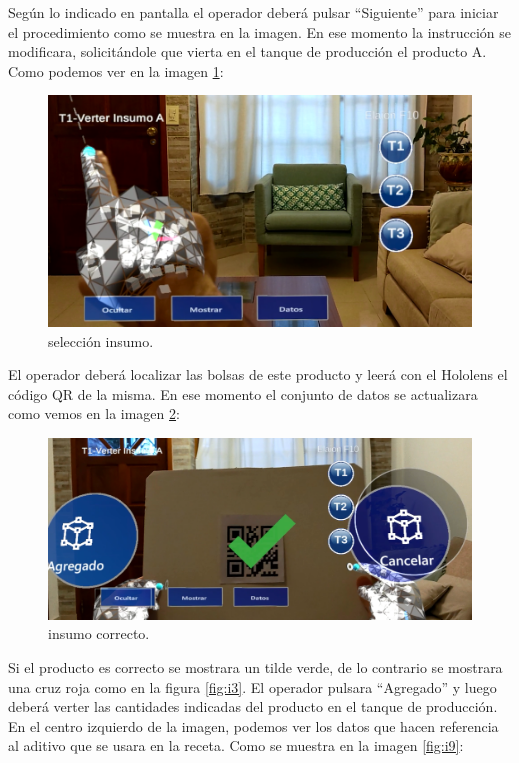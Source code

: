 Según lo indicado en pantalla el operador deberá pulsar ``Siguiente'' para iniciar el procedimiento como se muestra en la imagen. En ese momento la instrucción se modificara, solicitándole que vierta en el tanque de producción el producto A. Como podemos ver en la imagen \ref{fig:i7}:

\begin{figure}[htpb]
	\centering
	\includegraphics[scale=.5]{./Figures/i7.PNG}
	\caption{selección insumo\protect\footnotemark.}
	\label{fig:i7}
\end{figure}

El operador deberá localizar las bolsas de este producto y leerá con el Hololens el código QR de la misma. En ese momento el conjunto de datos se actualizara como vemos en la imagen \ref{fig:i8}:

\begin{figure}[htpb]
	\centering
	\includegraphics[scale=.5]{./Figures/i8.PNG}
	\caption{insumo correcto\protect\footnotemark.}
	\label{fig:i8}
\end{figure}

Si el producto es correcto se mostrara un tilde verde, de lo contrario se mostrara una cruz roja como en la figura \ref{fig:i3}. El operador pulsara ``Agregado'' y luego deberá verter las cantidades indicadas del producto en el tanque de producción. En el centro izquierdo de la imagen, podemos ver los datos que hacen referencia al aditivo que se usara en la receta. Como se muestra en la imagen \ref{fig:i9}:

